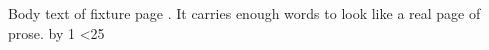 \documentclass[11pt,oneside]{book}
\begin{document}
\newcount\n {}
\loop
  \ifnum{} \else{}\fi
  Body text of fixture page \the\n. It carries enough words to look like a real page of prose.
  \newpage
  \advance\n by 1
\ifnum\n<25 \repeat
\end{document}
